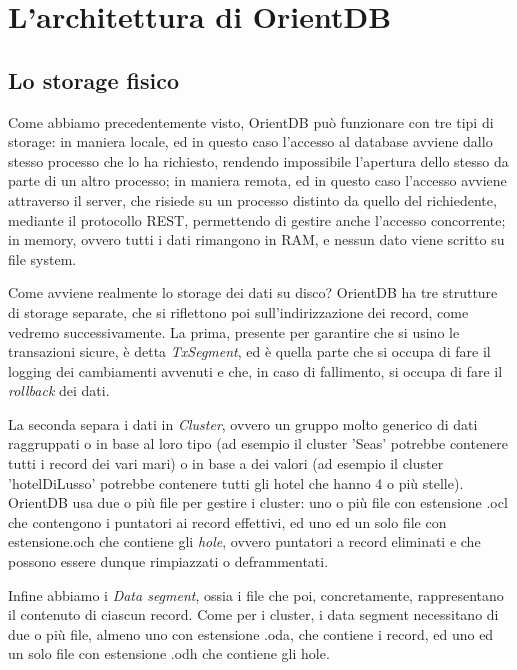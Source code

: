 \section{L'architettura di OrientDB}
\subsection{Lo storage fisico}
Come abbiamo precedentemente visto, OrientDB può funzionare con tre tipi di storage: in maniera locale, ed in questo caso l'accesso al database avviene dallo stesso processo che lo ha richiesto, rendendo impossibile l'apertura dello stesso da parte di un altro processo; in maniera remota, ed in questo caso l'accesso avviene attraverso il server, che risiede su un processo distinto da quello del richiedente, mediante il protocollo REST, permettendo di gestire anche l'accesso concorrente; in memory, ovvero tutti i dati rimangono in RAM, e nessun dato viene scritto su file system.

Come avviene realmente lo storage dei dati su disco? OrientDB ha tre strutture di storage separate, che si riflettono poi sull'indirizzazione dei record, come vedremo successivamente. La prima, presente per garantire che si usino le transazioni sicure, è detta \emph{TxSegment}, ed è quella parte che si occupa di fare il logging dei cambiamenti avvenuti e che, in caso di fallimento, si occupa di fare il \emph{rollback} dei dati.

La seconda separa i dati in \emph{Cluster}, ovvero un gruppo molto generico di dati raggruppati o in base al loro tipo (ad esempio il cluster 'Seas' potrebbe contenere tutti i record dei vari mari) o in base a dei valori (ad esempio il cluster 'hotelDiLusso' potrebbe contenere tutti gli hotel che hanno 4 o più stelle). OrientDB usa due o più file per gestire i cluster: uno o più file con estensione .ocl che contengono i puntatori ai record effettivi, ed uno ed un solo file con estensione.och che contiene gli \emph{hole}, ovvero puntatori a record eliminati e che possono essere dunque rimpiazzati o deframmentati.

Infine abbiamo i \emph{Data segment}, ossia i file che poi, concretamente, rappresentano il contenuto di ciascun record. Come per i cluster, i data segment necessitano di due o più file, almeno uno con estensione .oda, che contiene i record, ed uno ed un solo file con estensione .odh che contiene gli hole.

